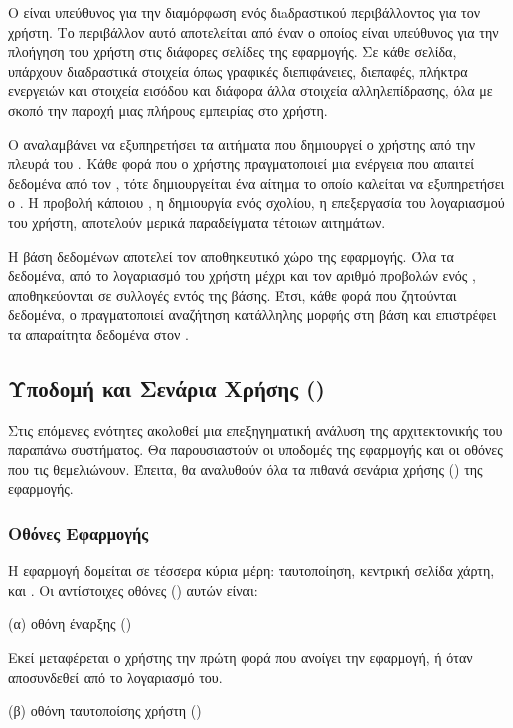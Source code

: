 Ο  είναι υπεύθυνος για την διαμόρφωση ενός διaδραστικού περιβάλλοντος για τον χρήστη. Το περιβάλλον αυτό αποτελείται από έναν  ο οποίος είναι υπεύθυνος για την πλοήγηση του χρήστη στις διάφορες σελίδες της εφαρμογής. Σε κάθε σελίδα, υπάρχουν διαδραστικά στοιχεία όπως γραφικές διεπιφάνειες, διεπαφές, πλήκτρα ενεργειών και στοιχεία εισόδου και διάφορα άλλα στοιχεία αλληλεπίδρασης, όλα με σκοπό την παροχή μιας πλήρους εμπειρίας στο χρήστη.

Ο  αναλαμβάνει να εξυπηρετήσει τα αιτήματα που δημιουργεί ο χρήστης από την πλευρά του . Κάθε φορά που ο χρήστης πραγματοποιεί μια ενέργεια που απαιτεί δεδομένα από τον , τότε δημιουργείται ένα αίτημα το οποίο καλείται να εξυπηρετήσει ο . Η προβολή κάποιου , η δημιουργία ενός σχολίου, η επεξεργασία του λογαριασμού του χρήστη, αποτελούν μερικά παραδείγματα τέτοιων αιτημάτων.

Η βάση δεδομένων αποτελεί τον αποθηκευτικό χώρο της εφαρμογής. Όλα τα δεδομένα, από το λογαριασμό του χρήστη μέχρι και τον αριθμό προβολών ενός , αποθηκεύονται σε συλλογές εντός της βάσης. Έτσι, κάθε φορά που ζητούνται δεδομένα, ο  πραγματοποιεί αναζήτηση κατάλληλης μορφής στη βάση και επιστρέφει τα απαραίτητα δεδομένα στον .


\subsection{Υποδομή  και Σενάρια Χρήσης (\textit{})}
Στις επόμενες ενότητες ακολοθεί μια επεξηγηματική ανάλυση της αρχιτεκτονικής του παραπάνω συστήματος. Θα παρουσιαστούν οι υποδομές της εφαρμογής και οι οθόνες που τις θεμελιώνουν. Έπειτα, θα αναλυθούν όλα τα πιθανά σενάρια χρήσης () της εφαρμογής. 

\subsubsection{Οθόνες Εφαρμογής}
Η εφαρμογή δομείται σε τέσσερα κύρια μέρη: ταυτοποίηση, κεντρική σελίδα χάρτη,  και . Οι αντίστοιχες οθόνες () αυτών είναι:
\item (α) οθόνη έναρξης (\textit{})

Εκεί μεταφέρεται ο χρήστης την πρώτη φορά που ανοίγει την εφαρμογή, ή όταν αποσυνδεθεί από το λογαριασμό του.

\item (β) οθόνη ταυτοποίσης χρήστη (\textit{}) 


